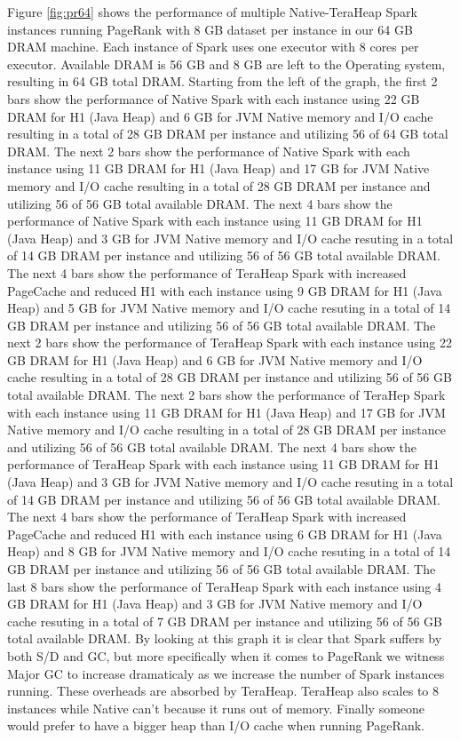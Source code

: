 \documentclass[twocolumn,10pt]{asme2e}
\begin{document}
Figure \ref{fig:pr64} shows the performance of multiple Native-TeraHeap Spark instances running PageRank with 8 GB dataset per instance in our 64 GB DRAM machine. Each instance of Spark uses one executor with 8 cores per executor. Available DRAM is 56 GB and 8 GB are left to the Operating system, resulting in 64 GB total DRAM. Starting from the left of the graph, the first 2 bars show the performance of Native Spark with each instance using 22 GB DRAM for H1 (Java Heap) and 6 GB for JVM Native memory and I/O cache resulting in a total of 28 GB DRAM per instance and utilizing 56 of 64 GB total DRAM. The next 2 bars show the performance of Native Spark with each instance using 11 GB DRAM for H1 (Java Heap) and 17 GB for JVM Native memory and I/O cache resulting in a total of 28 GB DRAM per instance and utilizing 56 of 56 GB total available DRAM. The next 4 bars show the performance of Native Spark with each instance using 11 GB DRAM for H1 (Java Heap) and 3 GB for JVM Native memory and I/O cache resuting in a total of 14 GB DRAM per instance and utilizing 56 of 56 GB total available DRAM. The next 4 bars show the performance of TeraHeap Spark with increased PageCache and reduced H1 with each instance using 9 GB DRAM for H1 (Java Heap) and 5 GB for JVM Native memory and I/O cache resuting in a total of 14 GB DRAM per instance and utilizing 56 of 56 GB total available DRAM. 
The next 2 bars show the performance of TeraHeap Spark with each instance using 22 GB DRAM for H1 (Java Heap) and 6 GB for JVM Native memory and I/O cache resulting in a total of 28 GB DRAM per instance and utilizing 56 of 56 GB total available DRAM. The next 2 bars show the performance of TeraHep Spark with each instance using 11 GB DRAM for H1 (Java Heap) and 17 GB for JVM Native memory and I/O cache resulting in a total of 28 GB DRAM per instance and utilizing 56 of 56 GB total available DRAM. The next 4 bars show the performance of TeraHeap Spark with each instance using 11 GB DRAM for H1 (Java Heap) and 3 GB for JVM Native memory and I/O cache resuting in a total of 14 GB DRAM per instance and utilizing 56 of 56 GB total available DRAM. The next 4 bars show the performance of TeraHeap Spark with increased PageCache and reduced H1 with each instance using 6 GB DRAM for H1 (Java Heap) and 8 GB for JVM Native memory and I/O cache resuting in a total of 14 GB DRAM per instance and utilizing 56 of 56 GB total available DRAM. The last 8 bars show the performance of TeraHeap Spark with each instance using 4 GB DRAM for H1 (Java Heap) and 3 GB for JVM Native memory and I/O cache resuting in a total of 7 GB DRAM per instance and utilizing 56 of 56 GB total available DRAM.  
By looking at this graph it is clear that Spark suffers by both S/D and GC, but more specifically when it comes to PageRank we witness Major GC to increase dramaticaly as we increase the number of Spark instances running. These overheads are absorbed by TeraHeap. TeraHeap also scales to 8 instances while Native can't because it runs out of memory. Finally someone would prefer to have a bigger heap than I/O cache when running PageRank.
\end{document}
